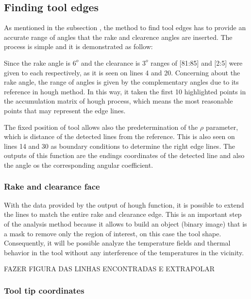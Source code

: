 	\subsection{Finding tool edges}

	As mentioned in the subsection , the method to find tool edges has to provide an accurate range of angles that the rake and clearence angles are inserted. The process is simple and it is demonstrated as follow:

	

	Since the rake angle is $6^{o}$ and the clearance is $3^{o}$ ranges of [81:85] and [2:5] were given to each respectively, as it is seen on lines 4 and 20. Concerning about the rake angle, the range of angles is given by the complementary angles due to its reference in hough method. In this way, it taken the first 10 highlighted points in the accumulation matrix of hough process, which means the most reasonable points that may represent the edge lines.

	The fixed position of tool allows also the predetermination of the $\rho$ parameter, which is distance of the detected lines from the reference. This is also seen on lines 14 and 30 as boundary conditions to determine the right edge lines. The outputs of this function are the endings coordinates of the detected line and also the angle os the corresponding angular coefficient. 


		\subsubsection{Rake and clearance face}

		With the data provided by the output of hough function, it is possible to extend the lines to match the entire rake and clearance edge. This is an important step of the analysis method because it allows to build an object (binary image) that is a mask to remove only the region of interest, on this case the tool shape. Consequently, it will be possible analyze the temperature fields and thermal behavior in the tool without any interference of the temperatures in the vicinity.

		FAZER FIGURA DAS LINHAS ENCONTRADAS E EXTRAPOLAR

		\subsubsection{Tool tip coordinates}

